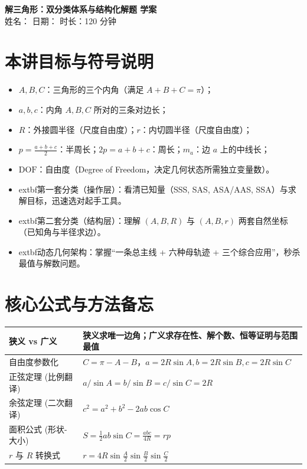 \documentclass[11pt,a4paper]{ctexart}
\newcommand{\sessionformulas}{%
  \arrayrulecolor{rulecolor}
  \begin{tabularx}{\textwidth}{p{4.2cm}X}
  \toprule[1.2pt]
  狭义 vs 广义 & 狭义求唯一边角；广义求存在性、解个数、恒等证明与范围最值\\ \midrule
  自由度参数化 & \(C = \pi-A-B\)，\(a=2R\sin A, b=2R\sin B, c=2R\sin C\)\\ \midrule
  正弦定理 (比例翻译) & \(a/\sin A = b/\sin B = c/\sin C = 2R\)\\ \midrule
  余弦定理 (二次翻译) & \(c^2 = a^2 + b^2 - 2ab\cos C\)\\ \midrule
  面积公式 (形状-大小) & \(S = \frac{1}{2}ab\sin C = \frac{abc}{4R} = rp\)\\ \midrule
  \(r\) 与 \(R\) 转换式 & \(r = 4R\sin\frac{A}{2}\sin\frac{B}{2}\sin\frac{C}{2}\)\\ \bottomrule[1.2pt]
  \end{tabularx}
}
\begin{document}
\begin{center}
  {\Large\bfseries 解三角形：双分类体系与结构化解题 学案}\\
  \vspace{0.5em}
  姓名：\blank{2.6cm}
  \quad
  日期：\blank{2.6cm}
  \quad
  时长：120 分钟
\end{center}

\section{本讲目标与符号说明}

\begin{tcolorbox}[colback=white,colframe=gray!80,arc=2mm,title=extbf{符号说明与几何含义规范}]
\begin{itemize}[itemsep=0.2em]
  \item \(A, B, C\)：三角形的三个内角（满足 \(A+B+C = \pi\)）；
  \item \(a, b, c\)：内角 \(A, B, C\) 所对的三条对边长；
  \item \(R\)：外接圆半径（尺度自由度）；\quad \(r\)：内切圆半径（尺度自由度）；
  \item \(p = \frac{a+b+c}{2}\)：半周长；\quad \(2p = a+b+c\)：周长；\quad \(m_a\)：边 \(a\) 上的中线长；
  \item \(\text{DOF}\)：自由度（Degree of Freedom，决定几何状态所需独立变量数）。
\end{itemize}
\end{tcolorbox}

\vspace{0.5em}

\begin{itemize}[itemsep=0.3em]
  \item extbf{第一套分类（操作层）}：看清已知量（SSS, SAS, ASA/AAS, SSA）与求解目标，迅速选对起手工具。
  \item extbf{第二套分类（结构层）}：理解 \((A,B,R)\) 与 \((A,B,r)\) 两套自然坐标（已知角与半径求边）。
  \item extbf{动态几何架构}：掌握“一条总主线 + 六种母轨迹 + 三个综合应用”，秒杀最值与解数问题。
\end{itemize}

\section{核心公式与方法备忘}

\begingroup
\large
\renewcommand{\arraystretch}{1.55}
\linespread{1.35}\selectfont
\showprompttrue
\sessionformulas
\endgroup
\end{document}

